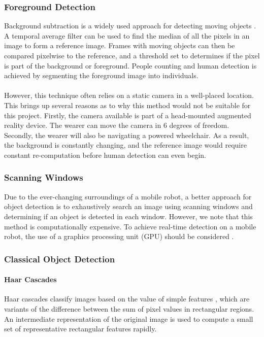 \subsubsection{Foreground Detection}
Background subtraction is a widely used approach for detecting moving objects \cite{Piccardi2004}. A temporal average filter can be used to find the median of all the pixels in an image to form a reference image. Frames with moving objects can then be compared pixelwise to the reference, and a threshold set to determines if the pixel is part of the background or foreground. People counting and human detection is achieved by segmenting the foreground image into individuals.

\paragraph{} However, this technique often relies on a static camera in a well-placed location. This brings up several reasons as to why this method would not be suitable for this project. Firstly, the camera available is part of a head-mounted augmented reality device. The wearer can move the camera in 6 degrees of freedom. Secondly, the wearer will also be navigating a powered wheelchair. As a result, the background is constantly changing, and the reference image would require constant re-computation before human detection can even begin.

\subsubsection{Scanning Windows}
Due to the ever-changing surroundings of a mobile robot, a better approach for object detection is to exhaustively search an image using scanning windows and determining if an object is detected in each window. However, we note that this method is computationally expensive. To achieve real-time detection on a mobile robot, the use of a graphics processing unit (GPU) should be considered \cite{Hirabayashi}.

\subsubsection{Classical Object Detection}

\paragraph{Haar Cascades}
Haar cascades classify images based on the value of simple features \cite{Viola2001}, which are variants of the difference between the sum of pixel values in rectangular regions. An intermediate representation of the original image is used to compute a small set of representative rectangular features rapidly.

